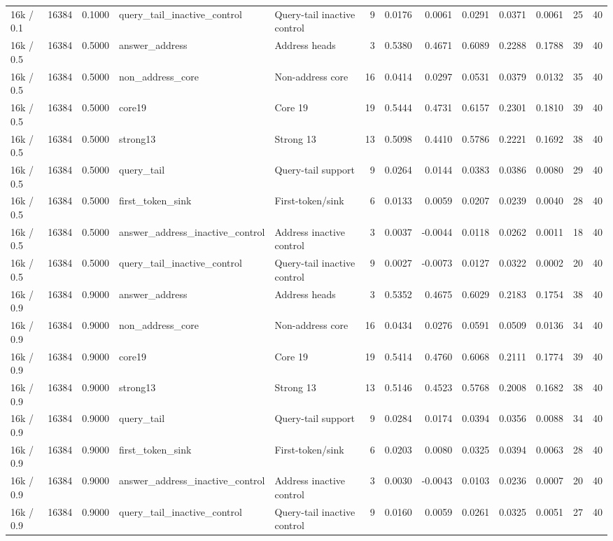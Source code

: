 \begin{tabular}{lrrllrrrrrrrr}
16k / 0.1 & 16384 & 0.1000 & query_tail_inactive_control & Query-tail inactive control & 9 & 0.0176 & 0.0061 & 0.0291 & 0.0371 & 0.0061 & 25 & 40 \\
16k / 0.5 & 16384 & 0.5000 & answer_address & Address heads & 3 & 0.5380 & 0.4671 & 0.6089 & 0.2288 & 0.1788 & 39 & 40 \\
16k / 0.5 & 16384 & 0.5000 & non_address_core & Non-address core & 16 & 0.0414 & 0.0297 & 0.0531 & 0.0379 & 0.0132 & 35 & 40 \\
16k / 0.5 & 16384 & 0.5000 & core19 & Core 19 & 19 & 0.5444 & 0.4731 & 0.6157 & 0.2301 & 0.1810 & 39 & 40 \\
16k / 0.5 & 16384 & 0.5000 & strong13 & Strong 13 & 13 & 0.5098 & 0.4410 & 0.5786 & 0.2221 & 0.1692 & 38 & 40 \\
16k / 0.5 & 16384 & 0.5000 & query_tail & Query-tail support & 9 & 0.0264 & 0.0144 & 0.0383 & 0.0386 & 0.0080 & 29 & 40 \\
16k / 0.5 & 16384 & 0.5000 & first_token_sink & First-token/sink & 6 & 0.0133 & 0.0059 & 0.0207 & 0.0239 & 0.0040 & 28 & 40 \\
16k / 0.5 & 16384 & 0.5000 & answer_address_inactive_control & Address inactive control & 3 & 0.0037 & -0.0044 & 0.0118 & 0.0262 & 0.0011 & 18 & 40 \\
16k / 0.5 & 16384 & 0.5000 & query_tail_inactive_control & Query-tail inactive control & 9 & 0.0027 & -0.0073 & 0.0127 & 0.0322 & 0.0002 & 20 & 40 \\
16k / 0.9 & 16384 & 0.9000 & answer_address & Address heads & 3 & 0.5352 & 0.4675 & 0.6029 & 0.2183 & 0.1754 & 38 & 40 \\
16k / 0.9 & 16384 & 0.9000 & non_address_core & Non-address core & 16 & 0.0434 & 0.0276 & 0.0591 & 0.0509 & 0.0136 & 34 & 40 \\
16k / 0.9 & 16384 & 0.9000 & core19 & Core 19 & 19 & 0.5414 & 0.4760 & 0.6068 & 0.2111 & 0.1774 & 39 & 40 \\
16k / 0.9 & 16384 & 0.9000 & strong13 & Strong 13 & 13 & 0.5146 & 0.4523 & 0.5768 & 0.2008 & 0.1682 & 38 & 40 \\
16k / 0.9 & 16384 & 0.9000 & query_tail & Query-tail support & 9 & 0.0284 & 0.0174 & 0.0394 & 0.0356 & 0.0088 & 34 & 40 \\
16k / 0.9 & 16384 & 0.9000 & first_token_sink & First-token/sink & 6 & 0.0203 & 0.0080 & 0.0325 & 0.0394 & 0.0063 & 28 & 40 \\
16k / 0.9 & 16384 & 0.9000 & answer_address_inactive_control & Address inactive control & 3 & 0.0030 & -0.0043 & 0.0103 & 0.0236 & 0.0007 & 20 & 40 \\
16k / 0.9 & 16384 & 0.9000 & query_tail_inactive_control & Query-tail inactive control & 9 & 0.0160 & 0.0059 & 0.0261 & 0.0325 & 0.0051 & 27 & 40 \\
\bottomrule
\end{tabular}
